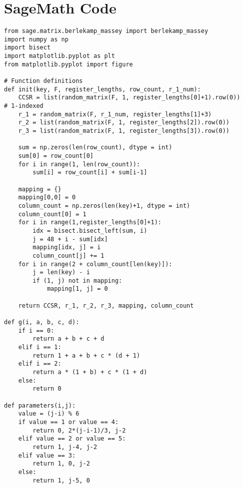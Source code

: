\documentclass[a4paper,10pt]{article}
\begin{document}
\section{SageMath Code}
\begin{verbatim}
from sage.matrix.berlekamp_massey import berlekamp_massey
import numpy as np
import bisect
import matplotlib.pyplot as plt
from matplotlib.pyplot import figure

# Function definitions
def init(key, F, register_lengths, row_count, r_1_num):
    CCSR = list(random_matrix(F, 1, register_lengths[0]+1).row(0))    # 1-indexed
    r_1 = random_matrix(F, r_1_num, register_lengths[1]+3)
    r_2 = list(random_matrix(F, 1, register_lengths[2]).row(0))
    r_3 = list(random_matrix(F, 1, register_lengths[3]).row(0))
    
    sum = np.zeros(len(row_count), dtype = int)
    sum[0] = row_count[0]
    for i in range(1, len(row_count)):
        sum[i] = row_count[i] + sum[i-1]
    
    mapping = {}
    mapping[0,0] = 0
    column_count = np.zeros(len(key)+1, dtype = int)
    column_count[0] = 1
    for i in range(1,register_lengths[0]+1):
        idx = bisect.bisect_left(sum, i)
        j = 48 + i - sum[idx]
        mapping[idx, j] = i
        column_count[j] += 1
    for i in range(2 + column_count[len(key)]):
        j = len(key) - i
        if (1, j) not in mapping:
            mapping[1, j] = 0
    
    return CCSR, r_1, r_2, r_3, mapping, column_count

def g(i, a, b, c, d):
    if i == 0:
        return a + b + c + d
    elif i == 1:
        return 1 + a + b + c * (d + 1)
    elif i == 2:
        return a * (1 + b) + c * (1 + d)
    else:
        return 0

def parameters(i,j):
    value = (j-i) % 6
    if value == 1 or value == 4:
        return 0, 2*(j-i-1)/3, j-2
    elif value == 2 or value == 5:
        return 1, j-4, j-2
    elif value == 3:
        return 1, 0, j-2
    else:
        return 1, j-5, 0


\end{verbatim}
\end{document}
